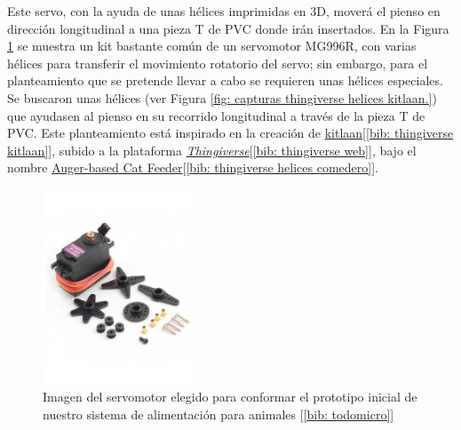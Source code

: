 \documentclass[12pt]{article}
\begin{document}
	\noindent Este servo, con la ayuda de unas hélices imprimidas en 3D, moverá el pienso en dirección longitudinal a una pieza T de PVC donde irán insertados. En la Figura \ref{Imagen servomotor MG996R} se muestra un kit bastante común de un servomotor MG996R, con varias hélices para transferir el movimiento rotatorio del servo; sin embargo, para el planteamiento que se pretende llevar a cabo se requieren unas hélices especiales. Se buscaron unas hélices (ver Figura \ref{fig: capturas thingiverse helices kitlaan.}) que ayudasen al pienso en su recorrido longitudinal a través de la pieza T de PVC. Este planteamiento está inspirado en la creación de \href{https://www.thingiverse.com/kitlaan/designs}{kitlaan}[\ref{bib: thingiverse kitlaan}], subido a la plataforma \href{https://www.thingiverse.com/}{\textit{Thingiverse}}[\ref{bib: thingiverse web}], bajo el nombre \href{https://www.thingiverse.com/thing:27854}{Auger-based Cat Feeder}[\ref{bib: thingiverse helices comedero}]. 
	
	\pagebreak
	
	\begin{figure}[h!]
		\begin{center}
			\includegraphics[width=0.4\textwidth]{img/servo_mg996r.jpg}
			\caption{Imagen del servomotor elegido para conformar el prototipo inicial de nuestro sistema de alimentación para animales [\ref{bib: todomicro}]}
			\label{Imagen servomotor MG996R}
		\end{center}
	\end{figure}
	
	
\end{document}
